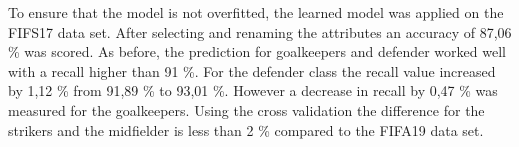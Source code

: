 To ensure that the model is not overfitted, the learned model was applied on the FIFS17 data set. After selecting and renaming the attributes an accuracy of 87,06 \% was scored.  %
As before, the prediction for goalkeepers and defender worked well with a recall higher than 91 \%. For the defender class the recall value increased by 1,12 \% from 91,89 \% to 93,01 \%. However a decrease in recall by 0,47 \% was measured for the goalkeepers.
Using the cross validation the difference for the strikers and the midfielder is less than 2 \% compared to the FIFA19 data set.



